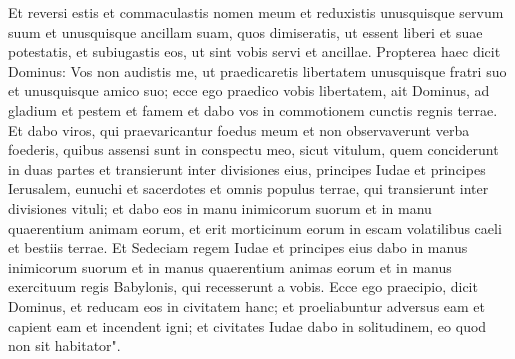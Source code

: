 \begin{biblechapter}
\verse Et reversi estis et commaculastis nomen meum et reduxistis unusquisque servum suum et unusquisque ancillam suam, quos dimiseratis, ut essent liberi et suae potestatis, et subiugastis eos, ut sint vobis servi et ancillae. 
\verse Propterea haec dicit Dominus: Vos non audistis me, ut praedicaretis libertatem unusquisque fratri suo et unusquisque amico suo; ecce ego praedico vobis libertatem, ait Dominus, ad gladium et pestem et famem et dabo vos in commotionem cunctis regnis terrae. 
\verse Et dabo viros, qui praevaricantur foedus meum et non observaverunt verba foederis, quibus assensi sunt in conspectu meo, sicut vitulum, quem conciderunt in duas partes et transierunt inter divisiones eius, 
\verse principes Iudae et principes Ierusalem, eunuchi et sacerdotes et omnis populus terrae, qui transierunt inter divisiones vituli;  
\verse et dabo eos in manu inimicorum suorum et in manu quaerentium animam eorum, et erit morticinum eorum in escam volatilibus caeli et bestiis terrae. 
\verse Et Sedeciam regem Iudae et principes eius dabo in manus inimicorum suorum et in manus quaerentium animas eorum et in manus exercituum regis Babylonis, qui recesserunt a vobis. 
\verse Ecce ego praecipio, dicit Dominus, et reducam eos in civitatem hanc; et proeliabuntur adversus eam et capient eam et incendent igni; et civitates Iudae dabo in solitudinem, eo quod non sit habitator". 
\end{biblechapter}

